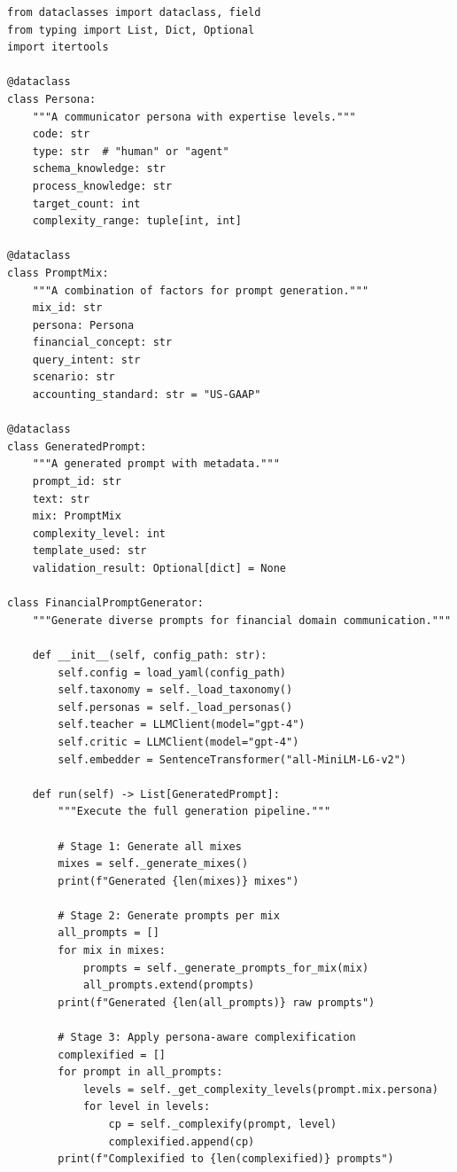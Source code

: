 \begin{lstlisting}[language=jsonx,caption={simula\_financial\_prompt\_generator.py}]
from dataclasses import dataclass, field
from typing import List, Dict, Optional
import itertools

@dataclass
class Persona:
    """A communicator persona with expertise levels."""
    code: str
    type: str  # "human" or "agent"
    schema_knowledge: str
    process_knowledge: str
    target_count: int
    complexity_range: tuple[int, int]

@dataclass
class PromptMix:
    """A combination of factors for prompt generation."""
    mix_id: str
    persona: Persona
    financial_concept: str
    query_intent: str
    scenario: str
    accounting_standard: str = "US-GAAP"

@dataclass
class GeneratedPrompt:
    """A generated prompt with metadata."""
    prompt_id: str
    text: str
    mix: PromptMix
    complexity_level: int
    template_used: str
    validation_result: Optional[dict] = None

class FinancialPromptGenerator:
    """Generate diverse prompts for financial domain communication."""
    
    def __init__(self, config_path: str):
        self.config = load_yaml(config_path)
        self.taxonomy = self._load_taxonomy()
        self.personas = self._load_personas()
        self.teacher = LLMClient(model="gpt-4")
        self.critic = LLMClient(model="gpt-4")
        self.embedder = SentenceTransformer("all-MiniLM-L6-v2")
    
    def run(self) -> List[GeneratedPrompt]:
        """Execute the full generation pipeline."""
        
        # Stage 1: Generate all mixes
        mixes = self._generate_mixes()
        print(f"Generated {len(mixes)} mixes")
        
        # Stage 2: Generate prompts per mix
        all_prompts = []
        for mix in mixes:
            prompts = self._generate_prompts_for_mix(mix)
            all_prompts.extend(prompts)
        print(f"Generated {len(all_prompts)} raw prompts")
        
        # Stage 3: Apply persona-aware complexification
        complexified = []
        for prompt in all_prompts:
            levels = self._get_complexity_levels(prompt.mix.persona)
            for level in levels:
                cp = self._complexify(prompt, level)
                complexified.append(cp)
        print(f"Complexified to {len(complexified)} prompts")
        

\end{lstlisting}
